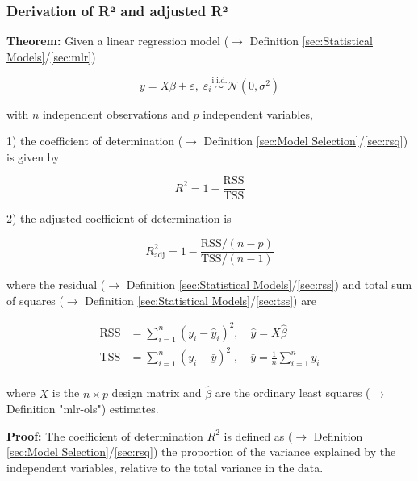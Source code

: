 \documentclass[a4paper,12pt,twoside]{book}
\begin{document}
\subsubsection[\textbf{Derivation of R² and adjusted R²}]{Derivation of R² and adjusted R²} \label{sec:rsq-der}
\setcounter{equation}{0}

\textbf{Theorem:} Given a linear regression model ($\rightarrow$ Definition \ref{sec:Statistical Models}/\ref{sec:mlr})

\begin{equation} \label{eq:rsq-der-rsq-mlr}
y = X\beta + \varepsilon, \; \varepsilon_i \overset{\mathrm{i.i.d.}}{\sim} \mathcal{N}(0, \sigma^2)
\end{equation}

with $n$ independent observations and $p$ independent variables,

1) the coefficient of determination ($\rightarrow$ Definition \ref{sec:Model Selection}/\ref{sec:rsq}) is given by

\begin{equation} \label{eq:rsq-der-R2}
R^2 = 1 - \frac{\mathrm{RSS}}{\mathrm{TSS}}
\end{equation}

2) the adjusted coefficient of determination is

\begin{equation} \label{eq:rsq-der-R2-adj}
R^2_{\mathrm{adj}} = 1 - \frac{\mathrm{RSS}/(n-p)}{\mathrm{TSS}/(n-1)}
\end{equation}

where the residual ($\rightarrow$ Definition \ref{sec:Statistical Models}/\ref{sec:rss}) and total sum of squares ($\rightarrow$ Definition \ref{sec:Statistical Models}/\ref{sec:tss}) are

\begin{equation} \label{eq:rsq-der-SS}
\begin{split}
\mathrm{RSS} &= \sum_{i=1}^{n} (y_i - \hat{y}_i)^2, \quad \hat{y} = X\hat{\beta} \\
\mathrm{TSS} &= \sum_{i=1}^{n} (y_i - \bar{y})^2\;, \quad \bar{y} = \frac{1}{n} \sum_{i=1}^n y_i \\
\end{split}
\end{equation}

where $X$ is the $n \times p$ design matrix and $\hat{\beta}$ are the ordinary least squares ($\rightarrow$ Definition "mlr-ols") estimates.


\vspace{1em}
\textbf{Proof:} The coefficient of determination $R^2$ is defined as ($\rightarrow$ Definition \ref{sec:Model Selection}/\ref{sec:rsq}) the proportion of the variance explained by the independent variables, relative to the total variance in the data.
\end{document}
